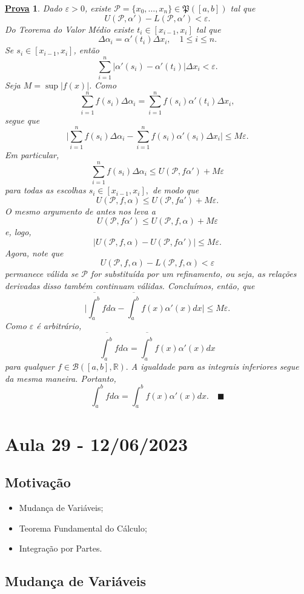 \documentclass{article}
\newtheorem*{proof*}{\underline{Prova}}
\renewcommand\qedsymbol{$\blacksquare$}
\begin{document}
\begin{proof*}
  Dado \(\varepsilon > 0\), existe \(\mathcal{P} = \{x_{0},\dotsc ,x_{n}\}\in \mathfrak{P}([a, b])\) tal que 
    \[
      U(\mathcal{P}, \alpha ') - L(\mathcal{P}, \alpha') < \varepsilon .
    \]
    Do \hypertarget{mean_value}{Teorema do Valor Médio} existe \(t_{i}\in [x_{i-1}, x_{i}]\) tal que 
      \[
        \Delta \alpha_{i} = \alpha'(t_{i})\Delta x_{i},\quad 1\leq i\leq n.
      \]
    Se \(s_{i}\in [x_{i-1}, x_{i}]\), então 
      \[
        \sum\limits_{i=1}^{n}|\alpha '(s_{i}) - \alpha '(t_{i})|\Delta x_{i} < \varepsilon .
      \]
  Seja \(M = \sup|f(x)|\). Como
    \[
      \sum\limits_{i=1}^{n}f(s_{i})\Delta \alpha_{i} = \sum\limits_{i=1}^{n}f(s_{i})\alpha'(t_{i})\Delta x_{i},
    \]
  segue que
    \[
      \biggl\vert \sum\limits_{i=1}^{n}f(s_{i})\Delta \alpha_{i} - \sum\limits_{i=1}^{n}f(s_{i})\alpha'(s_{i})\Delta x_{i} \biggr\vert \leq M\varepsilon .
    \]
  Em particular,
    \[
    \sum\limits_{i=1}^{n}f(s_{i})\Delta \alpha_{i} \leq U(\mathcal{P}, f\alpha') + M\varepsilon 
    \]
  para todas as escolhas \(s_{i}\in [x_{i-1}, x_{i}],\) de modo que 
    \[
      U(\mathcal{P}, f, \alpha )\leq U(\mathcal{P}, fa') + M\varepsilon .
    \]
  O mesmo argumento de antes nos leva a
    \[
      U(\mathcal{P}, f\alpha') \leq U(\mathcal{P}, f, \alpha ) + M\varepsilon  
    \]
  e, logo,
    \[
      |U(\mathcal{P}, f, \alpha ) - U(\mathcal{P}, f\alpha ')| \leq M\varepsilon .
    \]
    Agora, note que 
      \[
        U(\mathcal{P}, f, \alpha ) - L(\mathcal{P}, f, \alpha ) < \varepsilon 
      \]
    permanece válida se \(\mathcal{P}\) for substituída por um refinamento, ou seja, as relações derivadas disso
também continuam válidas. Concluímos, então, que 
  \[
    \biggl\vert \overline{\int_{a}^{b}}f d\alpha - \overline{\int_{a}^{b}}f(x)\alpha '(x)dx \biggr\vert\leq M\varepsilon .
  \]
  Como \(\varepsilon \) é arbitrário,
    \[
      \overline{\int_{a}^{b}}fd\alpha = \overline{\int_{a}^{b}}f(x)\alpha '(x)dx
    \]
  para qualquer \(f\in \mathcal{B}([a, b], \mathbb{R}).\) A igualdade para as integrais inferiores segue da mesma maneira. Portanto, 
    \[
      \int_{a}^{b}fd\alpha = \int_{a}^{b}f(x)\alpha '(x)dx.\quad \text{\qedsymbol}
    \]
\end{proof*}
\newpage
\section{Aula 29 - 12/06/2023}
\subsection{Motivação}
\begin{itemize}
  \item Mudança de Variáveis; 
  \item Teorema Fundamental do Cálculo; 
  \item Integração por Partes.
\end{itemize}
\subsection{Mudança de Variáveis}
\end{document}
